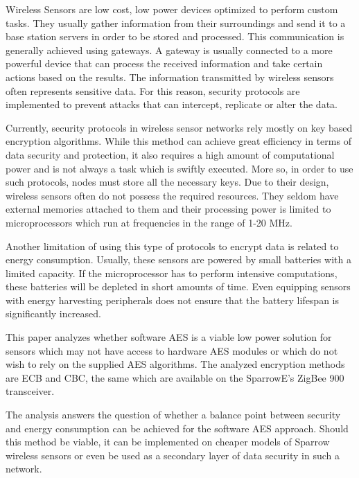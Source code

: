 Wireless Sensors are low cost, low power devices optimized to perform custom tasks. They usually
gather information from their surroundings and send it to a base station servers in order
to be stored and processed. This communication is generally achieved using gateways. A
gateway is usually connected to a more powerful device that can process the received information and take certain actions based on the results. 
The information transmitted by wireless sensors often represents sensitive data. For this reason, security protocols are implemented to 
prevent attacks that can intercept, replicate or alter the data.

Currently, security protocols in wireless sensor networks rely mostly on key based encryption algorithms. While this method can achieve 
great efficiency in terms of data security and protection, it also requires a high amount of computational power and is not 
always a task which is swiftly executed. More so, in order to use such protocols, nodes must store all the necessary keys.
Due to their design, wireless sensors often do not possess the required resources. They seldom have external memories attached 
to them and their processing power is limited to microprocessors which run at frequencies in the range of 1-20 MHz.

Another limitation of using this type of protocols to encrypt data is related to energy consumption. Usually, these sensors are 
powered by small batteries with a limited capacity. If the microprocessor has to perform intensive computations, these batteries 
will be depleted in short amounts of time. Even equipping sensors with energy harvesting peripherals does not ensure that 
the battery lifespan is significantly increased.

This paper analyzes whether software AES is a viable low power solution for sensors which may not have access to hardware AES modules 
or which do not wish to rely on the supplied AES algorithms. The analyzed encryption methods are ECB and CBC, the same which are 
available on the SparrowE's ZigBee 900 transceiver.

The analysis answers the question of whether a balance point between security and energy consumption can be achieved for the software AES approach. 
Should this method be viable, it can be implemented on cheaper models of Sparrow wireless sensors or even be used as a secondary layer of data security 
in such a network.
